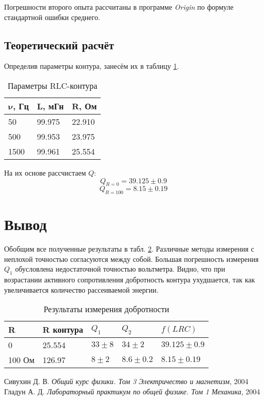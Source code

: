 \documentclass[a4paper]{article}
\begin{document}
Погрешности второго опыта рассчитаны в программе \emph{Origin} по формуле стандартной ошибки среднего.

\subsection{Теоретический расчёт}

Определив параметры контура, занесём их в таблицу \ref{2}.

\begin{table}[h]
	\centering
	\begin{tabular}{|l|l|l|}
		\hline
		$\mathbf{\nu}${\bf,  Гц} & $\mathbf{L}${\bf, мГн} & $\mathbf{R}${\bf, Ом} \\ \hline
		50                       & 99.975                 & 22.910                \\ \hline
		500                      & 99.953                 & 23.975                \\ \hline
		1500                     & 99.961                 & 25.554                \\ \hline
	\end{tabular}
	\caption{Параметры RLC-контура}
	\label{2}
\end{table}

На их основе рассчистаем $Q$:
\begin{equation}\label{key}
	Q_{R=0} = 39.125 \pm 0.9
\end{equation}
\begin{equation}\label{key}
	Q_{R=100}=8.15 \pm 0.19
\end{equation}
\section{Вывод}

Обобщим все полученные результаты в табл. \ref{1}. Различные методы измерения с неплохой точностью согласуются между собой. Большая погрешность измерения $Q_1$ обусловлена недостаточной точностью вольтметра. Видно, что при возрастании активного сопротивления добротность контура ухудшается, так как увеличивается количество рассеиваемой энергии.
\begin{table}[h!]
	\centering
	\begin{tabular}{|l|l||l|l|l|}
		\hline
		R      & R контура & $Q_1$      & $Q_2$         & $f(LRC)$         \\ \hline
		0      & 25.554    & $33 \pm 8$ & $34 \pm 2$    & $39.125 \pm 0.9$ \\ \hline
		100 Ом & 126.97    & $8 \pm 2$  & $8.6 \pm 0.2$ & $8.15 \pm 0.19$  \\ \hline
	\end{tabular}
	\caption{Результаты измерения добротности}
	\label{1}
\end{table}


\newpage
\begin{thebibliography}{9}
 Сивухин Д. В. \emph{Общий курс физики. Том 3 Электричество и магнетизм}, 2004
 Гладун А. Д. \emph{Лабораторный практикум по общей физике. Том 1 Механика}, 2004
\end{thebibliography}
\end{document}
